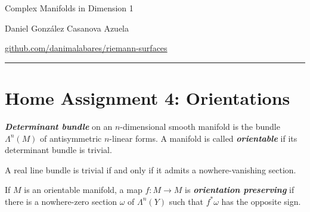 \documentclass{article}
\begin{document}
\begin{minipage}{\textwidth}
	\begin{minipage}{.5\textwidth}
		Complex Manifolds in Dimension 1\\
	\end{minipage}%
	\begin{minipage}{.5\textwidth}
		\raggedleft
		Daniel González Casanova Azuela\par
		{\small\href{https://github.com/danimalabares/riemann-surfaces}{github.com/danimalabares/riemann-surfaces}}
	\end{minipage}%
\end{minipage}\vspace{.2cm}\hrule
\section{Home Assignment 4: Orientations}
\setcounter{section}{4}
\begin{defn}
	\textbf{\textit{Determinant bundle}} on an $n$-dimensional smooth manifold is the bundle $\Lambda^n(M)$ of antisymmetric $n$-linear forms. A manifold is called \textbf{\textit{orientable}} if its determinant bundle is trivial.
\end{defn}

\begin{remark}
	A real line bundle is trivial if and only if it admits a nowhere-vanishing section.
\end{remark}

\begin{defn}
	If $M$ is an orientable manifold, a map $f:M\to M$ is \textbf{\textit{orientation preserving}} if there is a nowhere-zero section $\omega$ of $\Lambda^n(Y)$ such that $f^*\omega$ has the opposite sign.
\end{defn}
\end{document}
